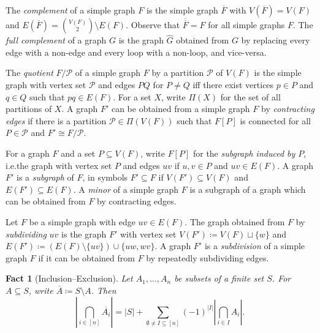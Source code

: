 \documentclass[3p,final]{elsarticle}
\newtheorem{fact}[theorem]{Fact}
\begin{document}
		

	The \emph{complement} of a simple graph $F$ is the simple graph $\overline{F}$ with $V(\overline{F}) = V(F)$ and $E(\overline{F}) = \binom{V(F)}{2} \setminus E(F)$.
	Observe that $\overline{\overline{F}} = F$ for all simple graphs $F$.
	The \emph{full complement} of a  graph $G$ is the graph $\widehat{G}$ obtained from $G$ by replacing every edge with a non-edge and every loop with a non-loop, and vice-versa.

	
	The \emph{quotient} $F/\mathcal{P}$ of a simple graph $F$ by a partition $\mathcal{P}$ of $V(F)$ is the simple graph with vertex set $\mathcal{P}$ and edges $PQ$ for $P \neq Q$ iff there exist vertices $p \in P$ and $q \in Q$ such that $pq \in E(F)$. 
For a set $X$, write $\Pi(X)$ for the set of all partitions of $X$.	
	A graph $F'$ can be obtained from a simple graph $F$ by \emph{contracting edges} if there is a partition $\mathcal{P} \in \Pi(V(F))$ such that $F[P]$ is connected for all $P \in \mathcal{P}$ and $F' \cong F/\mathcal{P}$.
	
	For a graph $F$ and a set $P \subseteq V(F)$, write $F[P]$ for the \emph{subgraph induced by $P$}, i.e.\@ the graph with vertex set $P$ and edges $uv$ if $u,v \in P$ and $uv \in E(F)$.
	A graph $F'$ is a \emph{subgraph} of $F$, in symbols $F' \subseteq F$ if $V(F') \subseteq V(F)$ and $E(F') \subseteq E(F)$.
	A \emph{minor} of a simple graph $F$ is a subgraph of a graph which can be obtained from $F$ by contracting edges. 
	
	Let $F$ be a simple graph with edge $uv \in E(F)$. 
	The graph obtained from $F$ by \emph{subdividing} $uv$ is the graph $F'$ with vertex set $V(F') \coloneqq V(F) \sqcup \{w\}$ and $E(F') \coloneqq (E(F) \setminus \{uv\}) \cup \{uw, wv\}$.
	A graph $F'$ is a \emph{subdivision} of a simple graph $F$ if it can be obtained from $F$ by repeatedly subdividing edges.
	
	\begin{fact}[Inclusion--Exclusion] \label{fact:incl-excl}
		Let $A_1, \dots, A_n$ be subsets of a finite set $S$. For $A \subseteq S$, write $\overline{A} \coloneqq S \setminus A$. Then
		\[
		\left\lvert \bigcap_{i \in [n]} \overline{A_i} \right\rvert = |S| +  \sum_{\emptyset \neq I \subseteq [n]} (-1)^{|I|} \left\lvert \bigcap_{i \in I} A_i \right\rvert.
		\]
	\end{fact}
	
\end{document}
